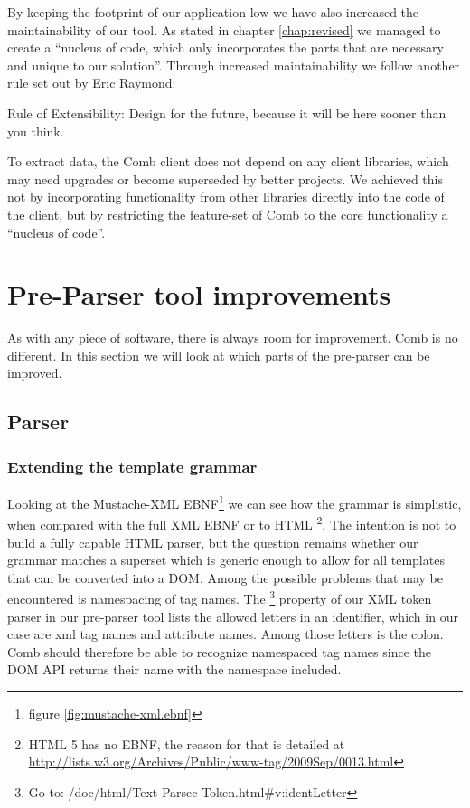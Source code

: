 \documentclass[thesis.tex]{subfiles}
\begin{document}
By keeping the footprint of our application low we have also increased the
maintainability of our tool. As stated in chapter \ref{chap:revised} we managed
to create a ``nucleus of code, which only incorporates the parts that are
necessary and unique to our solution''. Through increased maintainability we
follow another rule set out by Eric Raymond:
\begin{citequote}{\cite[Chapter 1]{UXART}}
Rule of Extensibility: Design for the future, because it will be here sooner than you think.
\end{citequote}
To extract data, the Comb client does not depend on any client libraries, which
may need upgrades or become superseded by better projects.
We achieved this not by incorporating functionality from other libraries
directly into the code of the client, but by restricting the feature-set of Comb
to the core functionality a ``nucleus of code''.




\section{Pre-Parser tool improvements}
As with any piece of software, there is always room for improvement.
Comb is no different. In this section we will look at which parts of the
pre-parser can be improved.

\subsection{Parser}

\subsubsection{Extending the template grammar}
Looking at the Mustache-XML EBNF\footnote{figure \ref{fig:mustache-xml.ebnf}} we
can see how the grammar is simplistic, when compared with the
full XML \cite[section 2/\#sec-documents]{XMLSPEC} EBNF or to
HTML \cite{HTMLSPEC}\footnote{
	HTML 5 has no EBNF, the reason for that is detailed at
	\url{http://lists.w3.org/Archives/Public/www-tag/2009Sep/0013.html}
}. The intention is not to build a fully capable HTML parser, but the question
remains whether our grammar matches a superset which is generic enough to allow
for all templates that can be converted into a DOM. Among the possible problems
that may be encountered is namespacing of tag names. The 
\cite{PARSECDOC}\footnote{
	Go to: /doc/html/Text-Parsec-Token.html\#v:identLetter
} property of our XML token parser in our
pre-parser tool lists the allowed letters in an identifier,
which in our case are xml tag names and attribute names. Among those letters is
the colon. Comb should therefore be able to recognize namespaced tag names
since the DOM API returns their name with the namespace included.
\end{document}
